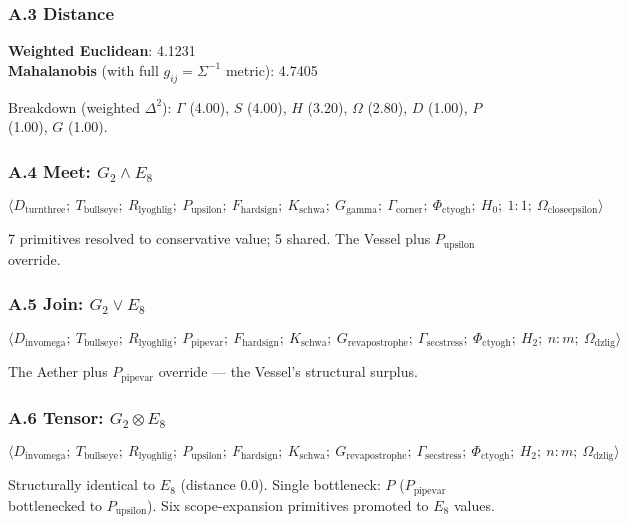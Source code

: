 \documentclass[12pt,a4paper]{article}
\begin{document}
\subsubsection{A.3 Distance}

\textbf{Weighted Euclidean}: 4.1231 \\
\textbf{Mahalanobis} (with full $g_{ij} = \Sigma^{-1}$ metric): 4.7405

Breakdown (weighted $\Delta^2$): $\Gamma$ (4.00), $S$ (4.00), $H$ (3.20), $\Omega$ (2.80), $D$ (1.00), $P$ (1.00), $G$ (1.00).

\subsubsection{A.4 Meet: $G_2 \wedge E_8$}

\[\langle D_{\text{turnthree}};\ T_{\text{bullseye}};\ R_{\text{lyoghlig}};\ P_{\text{upsilon}};\ F_{\text{hardsign}};\ K_{\text{schwa}};\ G_{\text{gamma}};\ \Gamma_{\text{corner}};\ \Phi_{\text{ctyogh}};\ H_0;\ 1{:}1;\ \Omega_{\text{closeepsilon}} \rangle\]

7 primitives resolved to conservative value; 5 shared. The Vessel plus $P_{\text{upsilon}}$ override.

\subsubsection{A.5 Join: $G_2 \vee E_8$}

\[\langle D_{\text{invomega}};\ T_{\text{bullseye}};\ R_{\text{lyoghlig}};\ P_{\text{pipevar}};\ F_{\text{hardsign}};\ K_{\text{schwa}};\ G_{\text{revapostrophe}};\ \Gamma_{\text{secstress}};\ \Phi_{\text{ctyogh}};\ H_2;\ n{:}m;\ \Omega_{\text{dzlig}} \rangle\]

The Aether plus $P_{\text{pipevar}}$ override --- the Vessel's structural surplus.

\subsubsection{A.6 Tensor: $G_2 \otimes E_8$}

\[\langle D_{\text{invomega}};\ T_{\text{bullseye}};\ R_{\text{lyoghlig}};\ P_{\text{upsilon}};\ F_{\text{hardsign}};\ K_{\text{schwa}};\ G_{\text{revapostrophe}};\ \Gamma_{\text{secstress}};\ \Phi_{\text{ctyogh}};\ H_2;\ n{:}m;\ \Omega_{\text{dzlig}} \rangle\]

Structurally identical to $E_8$ (distance 0.0). Single bottleneck: $P$ ($P_{\text{pipevar}}$ bottlenecked to $P_{\text{upsilon}}$). Six scope-expansion primitives promoted to $E_8$ values.
\end{document}
